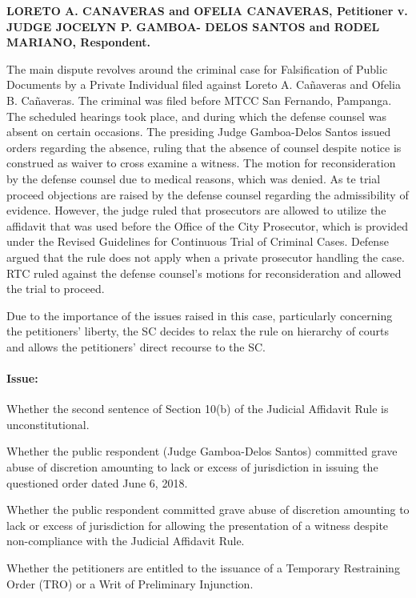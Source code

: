 \documentclass[
12pt,
oneside,
onehalfspacing,
headsepline
]{DigestCollection}
\begin{document}
\noindent\textbf{LORETO A. CANAVERAS and OFELIA CANAVERAS, Petitioner v. \\JUDGE JOCELYN P. GAMBOA- DELOS SANTOS and RODEL MARIANO, Respondent. }\vspace{0.4cm}

The main dispute revolves around the criminal case for Falsification of Public Documents by a Private Individual filed against Loreto A. Cañaveras and Ofelia B. Cañaveras. The criminal was filed before MTCC San Fernando, Pampanga. The scheduled hearings took place, and during which the defense counsel was absent on certain occasions. The presiding Judge Gamboa-Delos Santos issued orders regarding the absence, ruling that the absence of counsel despite notice is construed as waiver to cross examine a witness. The motion for reconsideration by the defense counsel due to medical reasons, which was denied. As te trial proceed objections are raised by the defense counsel regarding the admissibility of evidence. However, the judge ruled that prosecutors are allowed to utilize the affidavit that was used before the Office of the City Prosecutor, which is provided under the Revised Guidelines for Continuous Trial of Criminal Cases. Defense argued that the rule does not apply when a private prosecutor handling the case. RTC ruled against the defense counsel's motions for reconsideration and allowed the trial to proceed.

Due to the importance of the issues raised in this case, particularly concerning the petitioners' liberty, the SC decides to relax the rule on hierarchy of courts and allows the petitioners' direct recourse to the SC.

\paragraph{Issue:}
\label{82874220-1146-11ef-a21b-81e54ec76734}


Whether the second sentence of Section 10(b) of the Judicial Affidavit Rule is unconstitutional. 

Whether the public respondent (Judge Gamboa-Delos Santos) committed grave abuse of discretion amounting to lack or excess of jurisdiction in issuing the questioned order dated June 6, 2018. 

Whether the public respondent committed grave abuse of discretion amounting to lack or excess of jurisdiction for allowing the presentation of a witness despite non-compliance with the Judicial Affidavit Rule. 

Whether the petitioners are entitled to the issuance of a Temporary Restraining Order (TRO) or a Writ of Preliminary Injunction.
\end{document}
